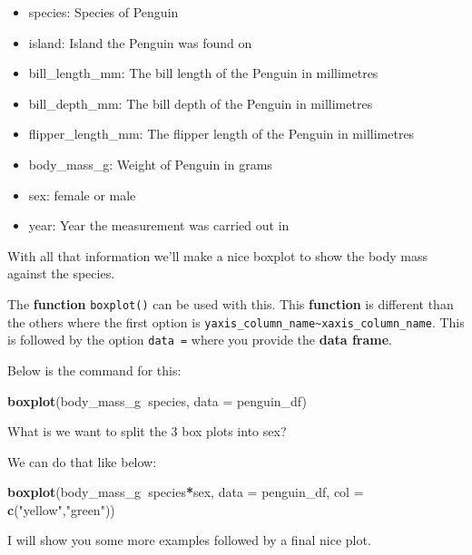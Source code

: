 \documentclass[]{book}
\newenvironment{Shaded}{\begin{snugshade}}{\end{snugshade}}
\newcommand{\KeywordTok}[1]{\textcolor[rgb]{0.13,0.29,0.53}{\textbf{#1}}}
\newcommand{\DataTypeTok}[1]{\textcolor[rgb]{0.13,0.29,0.53}{#1}}
\newcommand{\StringTok}[1]{\textcolor[rgb]{0.31,0.60,0.02}{#1}}
\newcommand{\OperatorTok}[1]{\textcolor[rgb]{0.81,0.36,0.00}{\textbf{#1}}}
\newcommand{\NormalTok}[1]{#1}
\providecommand{\tightlist}{%
  \setlength{\itemsep}{0pt}\setlength{\parskip}{0pt}}
\begin{document}
\begin{itemize}
\tightlist
\item
  species: Species of Penguin
\item
  island: Island the Penguin was found on
\item
  bill\_length\_mm: The bill length of the Penguin in millimetres
\item
  bill\_depth\_mm: The bill depth of the Penguin in millimetres
\item
  flipper\_length\_mm: The flipper length of the Penguin in millimetres
\item
  body\_mass\_g: Weight of Penguin in grams
\item
  sex: female or male
\item
  year: Year the measurement was carried out in
\end{itemize}

With all that information we'll make a nice boxplot to show the body
mass against the species.

The \textbf{function} \texttt{boxplot()} can be used with this. This
\textbf{function} is different than the others where the first option is
\texttt{yaxis\_column\_name\textasciitilde{}xaxis\_column\_name}. This
is followed by the option \texttt{data\ =} where you provide the
\textbf{data frame}.

Below is the command for this:

\begin{Shaded}
\begin{Highlighting}[]
\KeywordTok{boxplot}\NormalTok{(body_mass_g}\OperatorTok{~}\NormalTok{species, }\DataTypeTok{data =}\NormalTok{ penguin_df)}
\end{Highlighting}
\end{Shaded}

What is we want to split the 3 box plots into sex?

We can do that like below:

\begin{Shaded}
\begin{Highlighting}[]
\KeywordTok{boxplot}\NormalTok{(body_mass_g}\OperatorTok{~}\NormalTok{species}\OperatorTok{*}\NormalTok{sex, }\DataTypeTok{data =}\NormalTok{ penguin_df,}
        \DataTypeTok{col =} \KeywordTok{c}\NormalTok{(}\StringTok{"yellow"}\NormalTok{,}\StringTok{"green"}\NormalTok{))}
\end{Highlighting}
\end{Shaded}

I will show you some more examples followed by a final nice plot.
\end{document}
